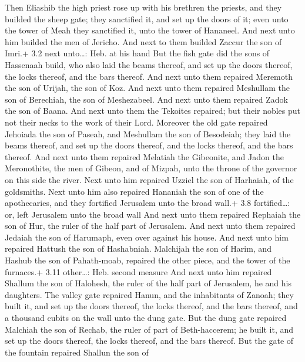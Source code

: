  Then Eliashib the high priest rose up with his brethren the
priests, and they builded the sheep gate; they sanctified it, and set up
the doors of it; even unto the tower of Meah they sanctified it, unto
the tower of Hananeel.  And next unto him builded the men of
Jericho. And next to them builded Zaccur the son of Imri.+ 3.2 next
unto\ldots: Heb. at his hand  But the fish gate did the sons
of Hassenaah build, who also laid the beams thereof, and set up the
doors thereof, the locks thereof, and the bars thereof.  And
next unto them repaired Meremoth the son of Urijah, the son of Koz. And
next unto them repaired Meshullam the son of Berechiah, the son of
Meshezabeel. And next unto them repaired Zadok the son of Baana.
 And next unto them the Tekoites repaired; but their nobles
put not their necks to the work of their Lord.  Moreover the
old gate repaired Jehoiada the son of Paseah, and Meshullam the son of
Besodeiah; they laid the beams thereof, and set up the doors thereof,
and the locks thereof, and the bars thereof.  And next unto
them repaired Melatiah the Gibeonite, and Jadon the Meronothite, the men
of Gibeon, and of Mizpah, unto the throne of the governor on this side
the river.  Next unto him repaired Uzziel the son of
Harhaiah, of the goldsmiths. Next unto him also repaired Hananiah the
son of one of the apothecaries, and they fortified Jerusalem unto the
broad wall.+ 3.8 fortified\ldots: or, left Jerusalem unto the broad wall
 And next unto them repaired Rephaiah the son of Hur, the
ruler of the half part of Jerusalem.  And next unto them
repaired Jedaiah the son of Harumaph, even over against his house. And
next unto him repaired Hattush the son of Hashabniah. 
Malchijah the son of Harim, and Hashub the son of Pahath-moab, repaired
the other piece, and the tower of the furnaces.+ 3.11 other\ldots: Heb.
second measure  And next unto him repaired Shallum the son
of Halohesh, the ruler of the half part of Jerusalem, he and his
daughters.  The valley gate repaired Hanun, and the
inhabitants of Zanoah; they built it, and set up the doors thereof, the
locks thereof, and the bars thereof, and a thousand cubits on the wall
unto the dung gate.  But the dung gate repaired Malchiah
the son of Rechab, the ruler of part of Beth-haccerem; he built it, and
set up the doors thereof, the locks thereof, and the bars thereof.
 But the gate of the fountain repaired Shallun the son of
